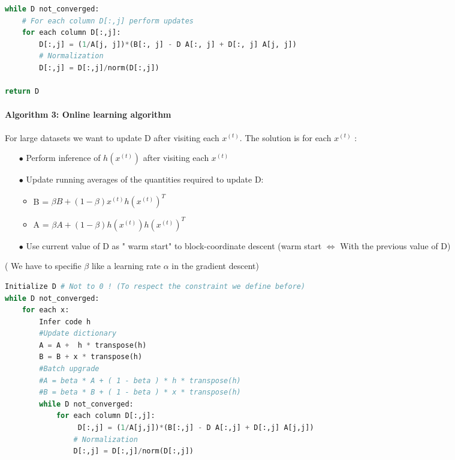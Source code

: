 \documentclass[a4paper,10pt]{article}
\begin{document}
\begin{lstlisting}[language=Python,frame=single]
while D not_converged:
    # For each column D[:,j] perform updates
    for each column D[:,j]:
        D[:,j] = (1/A[j, j])*(B[:, j] - D A[:, j] + D[:, j] A[j, j])
        # Normalization
        D[:,j] = D[:,j]/norm(D[:,j])

return D
\end{lstlisting}

\paragraph{Algorithm 3:  Online learning algorithm}
For large datasets we want to update D after  visiting each $x^{(t)}$. The solution is for each $x^{(t)}$ \cite{Mairal:2009:ODL:1553374.1553463} :
\begin{itemize}
 \item[$\bullet$]  Perform inference of $h(x^{(t)})$ after visiting each $x^{(t)}$
 \item[$\bullet$]  Update running averages of the quantities required to update D: 
        \begin{itemize}
         \item B = $\beta B + (1 - \beta) x^{(t)}h(x^{(t)})^T$
         \item A = $\beta A + (1 - \beta)h(x^{(t)}) h(x^{(t)})^T$
        \end{itemize}
\item[$\bullet$] Use current value of D as " warm start" to block-coordinate descent (warm start $\iff$ With the previous value of D)
\end{itemize}
( We have to specifie $\beta$ like a learning rate $\alpha$ in the gradient descent)

\begin{lstlisting}[language=Python,frame=single]
Initialize D # Not to 0 ! (To respect the constraint we define before)
while D not_converged:
    for each x:
        Infer code h
        #Update dictionary
        A = A +  h * transpose(h)
        B = B + x * transpose(h)
        #Batch upgrade
        #A = beta * A + ( 1 - beta ) * h * transpose(h)
        #B = beta * B + ( 1 - beta ) * x * transpose(h)
        while D not_converged:
            for each column D[:,j]:
                 D[:,j] = (1/A[j,j])*(B[:,j] - D A[:,j] + D[:,j] A[j,j])
                # Normalization
                D[:,j] = D[:,j]/norm(D[:,j]) 
\end{lstlisting}
\end{document}
